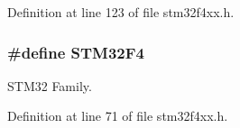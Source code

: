 Definition at line 123 of file stm32f4xx.\+h.

\subsubsection[{\texorpdfstring{S\+T\+M32\+F4}{STM32F4}}]{\setlength{\rightskip}{0pt plus 5cm}\#define S\+T\+M32\+F4}\hypertarget{group___library__configuration__section_ga84d985cb5667176091597f71ffdb9307}{}\label{group___library__configuration__section_ga84d985cb5667176091597f71ffdb9307}


S\+T\+M32 Family. 



Definition at line 71 of file stm32f4xx.\+h.

